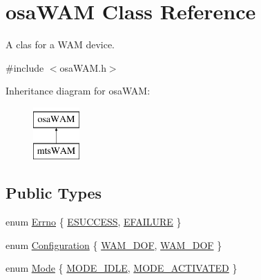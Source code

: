 \hypertarget{classosa_w_a_m}{}\section{osa\+W\+A\+M Class Reference}
\label{classosa_w_a_m}


A clas for a W\+A\+M device.  




{\ttfamily \#include $<$osa\+W\+A\+M.\+h$>$}

Inheritance diagram for osa\+W\+A\+M\+:\begin{figure}[H]
\begin{center}
\leavevmode
\includegraphics[height=2.000000cm]{d0/dfc/classosa_w_a_m}
\end{center}
\end{figure}
\subsection*{Public Types}
\begin{DoxyCompactItemize}
\item 
enum \hyperlink{classosa_w_a_m_aff15893cc52d67e46cb66de794109f9e}{Errno} \{ \hyperlink{classosa_w_a_m_aff15893cc52d67e46cb66de794109f9ea3ceea4462076eb66774b53a9e284ba99}{E\+S\+U\+C\+C\+E\+S\+S}, 
\hyperlink{classosa_w_a_m_aff15893cc52d67e46cb66de794109f9ea431d95fc5d82de9b4b25cd9b605d4ab3}{E\+F\+A\+I\+L\+U\+R\+E}
 \}
\item 
enum \hyperlink{classosa_w_a_m_ada0b00e10e6401b6b1801cd08f30748b}{Configuration} \{ \hyperlink{classosa_w_a_m_ada0b00e10e6401b6b1801cd08f30748baa9cabb285790b5bc0707d0fed0999a44}{W\+A\+M\+\_\+D\+O\+F}, 
\hyperlink{classosa_w_a_m_ada0b00e10e6401b6b1801cd08f30748ba1bdf2662bd26c893783934b814db4ac3}{W\+A\+M\+\_\+D\+O\+F}
 \}
\item 
enum \hyperlink{classosa_w_a_m_a3671dc191688751cf712bbbd5f36a0d0}{Mode} \{ \hyperlink{classosa_w_a_m_a3671dc191688751cf712bbbd5f36a0d0a80cc56decb5062248b58b30a4a438e90}{M\+O\+D\+E\+\_\+\+I\+D\+L\+E}, 
\hyperlink{classosa_w_a_m_a3671dc191688751cf712bbbd5f36a0d0a3bad271377f3201594b335aa5ea0c663}{M\+O\+D\+E\+\_\+\+A\+C\+T\+I\+V\+A\+T\+E\+D}
 \}
\end{DoxyCompactItemize}
